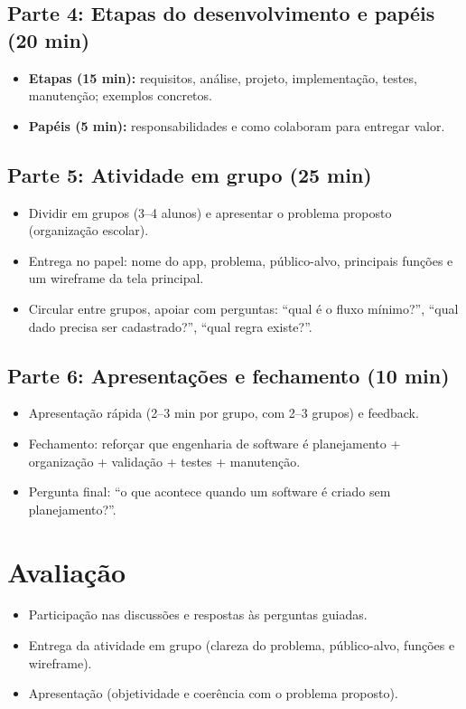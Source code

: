 \documentclass[12pt,a4paper]{article}
\begin{document}
\subsection*{Parte 4: Etapas do desenvolvimento e papéis (20 min)}
\begin{itemize}[leftmargin=*,itemsep=0.35em]
  \item \textbf{Etapas (15 min):} requisitos, análise, projeto, implementação, testes, manutenção; exemplos concretos.
  \item \textbf{Papéis (5 min):} responsabilidades e como colaboram para entregar valor.
\end{itemize}

\subsection*{Parte 5: Atividade em grupo (25 min)}
\begin{itemize}[leftmargin=*,itemsep=0.35em]
  \item Dividir em grupos (3--4 alunos) e apresentar o problema proposto (organização escolar).
  \item Entrega no papel: nome do app, problema, público-alvo, principais funções e um wireframe da tela principal.
  \item Circular entre grupos, apoiar com perguntas: ``qual é o fluxo mínimo?'', ``qual dado precisa ser cadastrado?'', ``qual regra existe?''.
\end{itemize}

\subsection*{Parte 6: Apresentações e fechamento (10 min)}
\begin{itemize}[leftmargin=*,itemsep=0.35em]
  \item Apresentação rápida (2--3 min por grupo, com 2--3 grupos) e feedback.
  \item Fechamento: reforçar que engenharia de software é planejamento + organização + validação + testes + manutenção.
  \item Pergunta final: ``o que acontece quando um software é criado sem planejamento?''.
\end{itemize}

\section{Avaliação}
\begin{itemize}[leftmargin=*,itemsep=0.25em]
  \item Participação nas discussões e respostas às perguntas guiadas.
  \item Entrega da atividade em grupo (clareza do problema, público-alvo, funções e wireframe).
  \item Apresentação (objetividade e coerência com o problema proposto).
\end{itemize}
\end{document}
